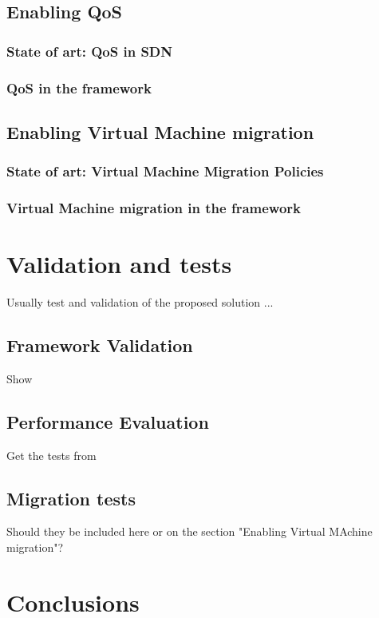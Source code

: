 \documentclass[12pt,english]{book}
\begin{document}
\section{Enabling QoS}
\subsection{State of art: QoS in SDN}
\subsection{QoS in the framework}

\section{Enabling Virtual Machine migration}
\subsection{State of art: Virtual Machine Migration Policies}
\subsection{Virtual Machine migration in the framework}


\chapter{Validation and tests \label{cha:valtes} }

Usually test and validation of the proposed solution ...

\section{Framework Validation}

Show 

\section{Performance Evaluation}

Get the tests from

\section{Migration tests}

Should they be included here or on the section "Enabling Virtual MAchine migration"?

\chapter{Conclusions\label{cha:conclusions}}
\end{document}

